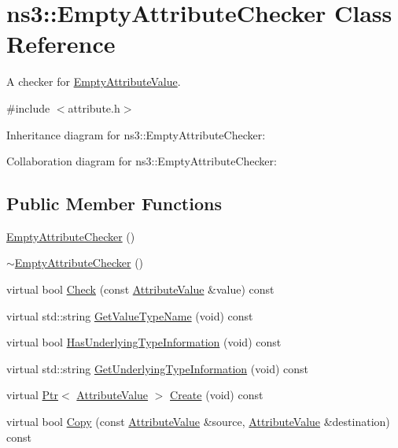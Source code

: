 \hypertarget{classns3_1_1EmptyAttributeChecker}{}\section{ns3\+:\+:Empty\+Attribute\+Checker Class Reference}
\label{classns3_1_1EmptyAttributeChecker}


A checker for \hyperlink{classns3_1_1EmptyAttributeValue}{Empty\+Attribute\+Value}.  




{\ttfamily \#include $<$attribute.\+h$>$}



Inheritance diagram for ns3\+:\+:Empty\+Attribute\+Checker\+:


Collaboration diagram for ns3\+:\+:Empty\+Attribute\+Checker\+:
\subsection*{Public Member Functions}
\begin{DoxyCompactItemize}
\item 
\hyperlink{classns3_1_1EmptyAttributeChecker_a0720a6e16e01a496ca74b8837cb2821b}{Empty\+Attribute\+Checker} ()
\item 
\hyperlink{classns3_1_1EmptyAttributeChecker_adec6888825419f33388574821ced0fcc}{$\sim$\+Empty\+Attribute\+Checker} ()
\item 
virtual bool \hyperlink{classns3_1_1EmptyAttributeChecker_a60e2a9e64b87a72b6a20cfb361632ade}{Check} (const \hyperlink{classns3_1_1AttributeValue}{Attribute\+Value} \&value) const 
\item 
virtual std\+::string \hyperlink{classns3_1_1EmptyAttributeChecker_a1924290dbc75f856c529e60b1b317af0}{Get\+Value\+Type\+Name} (void) const 
\item 
virtual bool \hyperlink{classns3_1_1EmptyAttributeChecker_ae0d9174f806124ee7311c4774b720a0c}{Has\+Underlying\+Type\+Information} (void) const 
\item 
virtual std\+::string \hyperlink{classns3_1_1EmptyAttributeChecker_ab6569087994fab5021de9abff35de88f}{Get\+Underlying\+Type\+Information} (void) const 
\item 
virtual \hyperlink{classns3_1_1Ptr}{Ptr}$<$ \hyperlink{classns3_1_1AttributeValue}{Attribute\+Value} $>$ \hyperlink{classns3_1_1EmptyAttributeChecker_a0782213fa659b6fbc145ea111e8c876a}{Create} (void) const 
\item 
virtual bool \hyperlink{classns3_1_1EmptyAttributeChecker_a03e7c414d54077ce3655c5e7c4be744c}{Copy} (const \hyperlink{classns3_1_1AttributeValue}{Attribute\+Value} \&source, \hyperlink{classns3_1_1AttributeValue}{Attribute\+Value} \&destination) const 
\end{DoxyCompactItemize}

